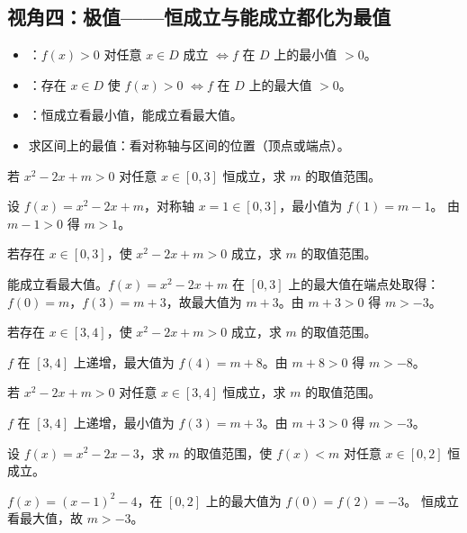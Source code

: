 \begin{explore}
\subsection{视角四：极值——恒成立与能成立都化为最值}

\begin{itemize}
  \item {}：$f(x)>0$ 对任意 $x\in D$ 成立 $\iff f$ 在 $D$ 上的最小值 $>0$。
  \item {}：存在 $x\in D$ 使 $f(x)>0$ $\iff f$ 在 $D$ 上的最大值 $>0$。
  \item {}：恒成立看最小值，能成立看最大值。
  \item 求区间上的最值：看对称轴与区间的位置（顶点或端点）。
\end{itemize}

\begin{example}
若 $x^2-2x+m>0$ 对任意 $x\in[0,3]$ 恒成立，求 $m$ 的取值范围。
\end{example}
\begin{solution}
设 $f(x)=x^2-2x+m$，对称轴 $x=1\in[0,3]$，最小值为 $f(1)=m-1$。
由 $m-1>0$ 得 $m>1$。
\end{solution}

\begin{example}
若存在 $x\in[0,3]$，使 $x^2-2x+m>0$ 成立，求 $m$ 的取值范围。
\end{example}
\begin{solution}
能成立看最大值。$f(x)=x^2-2x+m$ 在 $[0,3]$ 上的最大值在端点处取得：
$f(0)=m$，$f(3)=m+3$，故最大值为 $m+3$。由 $m+3>0$ 得 $m>-3$。
\end{solution}

\begin{problem}
若存在 $x\in[3,4]$，使 $x^2-2x+m>0$ 成立，求 $m$ 的取值范围。
\end{problem}
\begin{solution}
$f$ 在 $[3,4]$ 上递增，最大值为 $f(4)=m+8$。由 $m+8>0$ 得 $m>-8$。
\end{solution}

\begin{problem}
若 $x^2-2x+m>0$ 对任意 $x\in[3,4]$ 恒成立，求 $m$ 的取值范围。
\end{problem}
\begin{solution}
$f$ 在 $[3,4]$ 上递增，最小值为 $f(3)=m+3$。由 $m+3>0$ 得 $m>-3$。
\end{solution}

\begin{problem}
设 $f(x)=x^2-2x-3$，求 $m$ 的取值范围，使 $f(x)<m$ 对任意 $x\in[0,2]$ 恒成立。
\end{problem}
\begin{solution}
$f(x)=(x-1)^2-4$，在 $[0,2]$ 上的最大值为 $f(0)=f(2)=-3$。
恒成立看最大值，故 $m>-3$。
\end{solution}


\end{explore}
